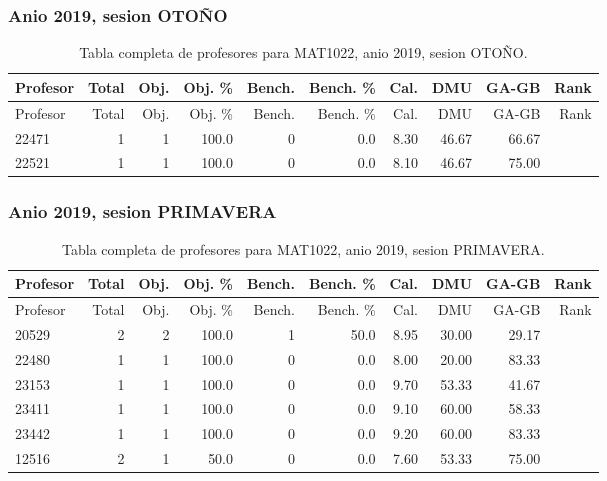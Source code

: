 \subsubsection{Anio 2019, sesion OTOÑO}

\begingroup
\scriptsize
\setlength{\tabcolsep}{3pt}
\begin{longtable}{lrrrrrrrrr}
\caption{Tabla completa de profesores para MAT1022, anio 2019, sesion OTOÑO.}\label{tab:prof-period-mat1022-2019-oto-o}\\
\toprule
Profesor & Total & Obj. & Obj. \% & Bench. & Bench. \% & Cal. & DMU & GA-GB & Rank \\
\midrule
\endfirsthead
\toprule
Profesor & Total & Obj. & Obj. \% & Bench. & Bench. \% & Cal. & DMU & GA-GB & Rank \\
\midrule
\endhead
22471 & 1 & 1 & 100.0 & 0 & 0.0 & 8.30 & 46.67 & 66.67 &  \\
22521 & 1 & 1 & 100.0 & 0 & 0.0 & 8.10 & 46.67 & 75.00 &  \\
\bottomrule
\end{longtable}
\endgroup

\subsubsection{Anio 2019, sesion PRIMAVERA}

\begingroup
\scriptsize
\setlength{\tabcolsep}{3pt}
\begin{longtable}{lrrrrrrrrr}
\caption{Tabla completa de profesores para MAT1022, anio 2019, sesion PRIMAVERA.}\label{tab:prof-period-mat1022-2019-primavera}\\
\toprule
Profesor & Total & Obj. & Obj. \% & Bench. & Bench. \% & Cal. & DMU & GA-GB & Rank \\
\midrule
\endfirsthead
\toprule
Profesor & Total & Obj. & Obj. \% & Bench. & Bench. \% & Cal. & DMU & GA-GB & Rank \\
\midrule
\endhead
20529 & 2 & 2 & 100.0 & 1 & 50.0 & 8.95 & 30.00 & 29.17 &  \\
22480 & 1 & 1 & 100.0 & 0 & 0.0 & 8.00 & 20.00 & 83.33 &  \\
23153 & 1 & 1 & 100.0 & 0 & 0.0 & 9.70 & 53.33 & 41.67 &  \\
23411 & 1 & 1 & 100.0 & 0 & 0.0 & 9.10 & 60.00 & 58.33 &  \\
23442 & 1 & 1 & 100.0 & 0 & 0.0 & 9.20 & 60.00 & 83.33 &  \\
12516 & 2 & 1 & 50.0 & 0 & 0.0 & 7.60 & 53.33 & 75.00 &  \\
\bottomrule
\end{longtable}
\endgroup


